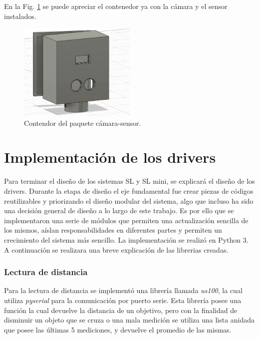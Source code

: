 En la Fig. \ref{fig:contenedor-camara-real} se puede apreciar el contenedor ya con la cámara y el sensor instalados.

\begin{figure}
    \centering
    \includegraphics[width=0.5\textwidth]{imgs/contenedor-camara.png}
    \caption{Contendor del paquete cámara-sensor.}
    \label{fig:contenedor-camara-real}
\end{figure}

\section{Implementación de los drivers}

Para terminar el diseño de los sistemas SL y SL mini, se explicará el diseño de los drivers. Durante la etapa de diseño el eje fundamental fue crear piezas de códigos reutilizables y priorizando el diseño modular del sistema, algo que incluso ha sido una decisión general de diseño a lo largo de este trabajo. Es por ello que se implementaron una serie de módulos que permiten una actualización sencilla de los mismos, aíslan responsabilidades en diferentes partes y permiten un crecimiento del sistema más sencillo. La implementación se realizó en Python 3. A continuación se realizara una breve explicación de las librerias creadas.


\subsubsection*{Lectura de distancia}

Para la lectura de distancia se implementó una librería llamada \textit{us100}, la cual utiliza \textit{pyserial} \cite{noauthor_documentacion_nodate-1} para la comunicación por puerto serie. Esta librería posee una función la cual devuelve la distancia de un objetivo, pero con la finalidad de disminuir un objeto que se cruza o una mala medición se utiliza una lista anidada que posee las últimas 5 mediciones, y devuelve el promedio de las mismas.

